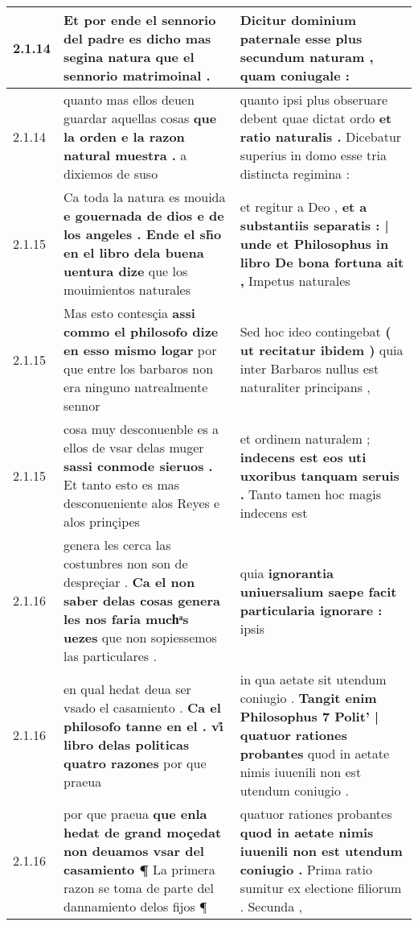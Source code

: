 \begin{tabular}{|p{1cm}|p{6.5cm}|p{6.5cm}|}
2.1.14 & Et por ende el sennorio del padre es dicho \textbf{ mas segina natura } que el sennorio matrimoinal . & Dicitur dominium paternale esse plus \textbf{ secundum naturam , } quam coniugale : \\\hline
2.1.14 & quanto mas ellos deuen guardar aquellas cosas \textbf{ que la orden e la razon natural muestra . } a dixiemos de suso & quanto ipsi plus obseruare debent quae dictat ordo \textbf{ et ratio naturalis . } Dicebatur superius in domo esse tria distincta regimina : \\\hline
2.1.15 & Ca toda la natura es mouida \textbf{ e gouernada de dios e de los angeles . Ende el sh̃o en el libro dela buena uentura dize } que los mouimientos naturales & et regitur a Deo , \textbf{ et a substantiis separatis : | unde et Philosophus in libro De bona fortuna ait , } Impetus naturales \\\hline
2.1.15 & Mas esto contesçia \textbf{ assi commo el philosofo dize en esso mismo logar } por que entre los barbaros non era ninguno natrealmente sennor & Sed hoc ideo contingebat \textbf{ ( ut recitatur ibidem ) } quia inter Barbaros nullus est naturaliter principans , \\\hline
2.1.15 & cosa muy desconuenble es a ellos de vsar delas muger \textbf{ sassi conmode sieruos . } Et tanto esto es mas desconueniente alos Reyes e alos prinçipes & et ordinem naturalem ; \textbf{ indecens est eos uti uxoribus tanquam seruis . } Tanto tamen hoc magis indecens est \\\hline
2.1.16 & genera les cerca las costunbres non son de despreçiar . \textbf{ Ca el non saber delas cosas genera les nos faria muchͣs uezes } que non sopiessemos las particulares . & quia \textbf{ ignorantia uniuersalium saepe facit particularia ignorare : } ipsis \\\hline
2.1.16 & en qual hedat deua ser vsado el casamiento . \textbf{ Ca el philosofo tanne en el . vi̊ libro delas politicas quatro razones } por que praeua & in qua aetate sit utendum coniugio . \textbf{ Tangit enim Philosophus 7 Polit’ | quatuor rationes probantes } quod in aetate nimis iuuenili non est utendum coniugio . \\\hline
2.1.16 & por que praeua \textbf{ que enla hedat de grand moçedat non deuamos vsar del casamiento ¶ } La primera razon se toma de parte del dannamiento delos fijos ¶ & quatuor rationes probantes \textbf{ quod in aetate nimis iuuenili non est utendum coniugio . } Prima ratio sumitur ex electione filiorum . Secunda , \\\hline

\end{tabular}
